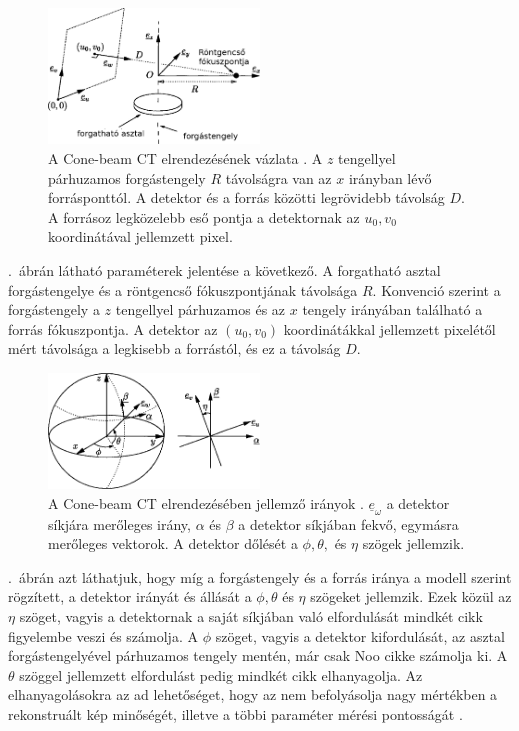 \documentclass[a4paper,12pt]{article}
\begin{document}
\begin{figure}[htbp]
\center
\includegraphics[width=0.5\textwidth]{abrak/geom1}
\caption{A Cone-beam CT elrendezésének vázlata \cite{noo}. A $z$ tengellyel párhuzamos forgástengely $R$ távolságra van az $x$ irányban lévő forrásponttól. A detektor és a forrás közötti legrövidebb távolság $D$. A forrásoz legközelebb eső pontja a detektornak az $u_0,v_0$ koordinátával jellemzett pixel. }
\label{fig:geom1}
\end{figure}





.~ábrán látható paraméterek jelentése a következő. A forgatható asztal forgástengelye és a röntgencső fókuszpontjának távolsága $R$. Konvenció szerint a forgástengely a $z$ tengellyel párhuzamos és az $x$ tengely irányában található a forrás fókuszpontja. A detektor az $(u_0,v_0)$ koordinátákkal jellemzett pixelétől mért távolsága a legkisebb a forrástól, és ez a távolság $D$.


\begin{figure}[htbp]
\center
\includegraphics[width=0.5\textwidth]{abrak/geom2}
\caption{A Cone-beam CT elrendezésében jellemző irányok \cite{noo}. $\underline{e}_\omega$ a detektor síkjára merőleges irány, $\alpha$ és $\beta$ a detektor síkjában fekvő, egymásra merőleges vektorok. A detektor dőlését a $\phi, \theta,$ és $\eta$ szögek jellemzik.}
\label{fig:geom2}
\end{figure}



 .~ábrán azt láthatjuk, hogy míg a forgástengely és a forrás iránya  a modell szerint rögzített, a detektor irányát és állását a   $\phi, \theta$ és $\eta$ szögeket jellemzik. Ezek közül az $\eta$ szöget, vagyis a detektornak a saját síkjában való elfordulását mindkét cikk figyelembe veszi és számolja. A $\phi$ szöget, vagyis a detektor kifordulását, az asztal forgástengelyével párhuzamos tengely mentén, már csak Noo \cite{noo} cikke számolja ki. A $\theta$  szöggel jellemzett elfordulást pedig mindkét cikk elhanyagolja. Az elhanyagolásokra az ad lehetőséget, hogy az nem befolyásolja nagy mértékben a rekonstruált kép minőségét, illetve a többi paraméter mérési pontosságát \cite{wu}. 
\end{document}
